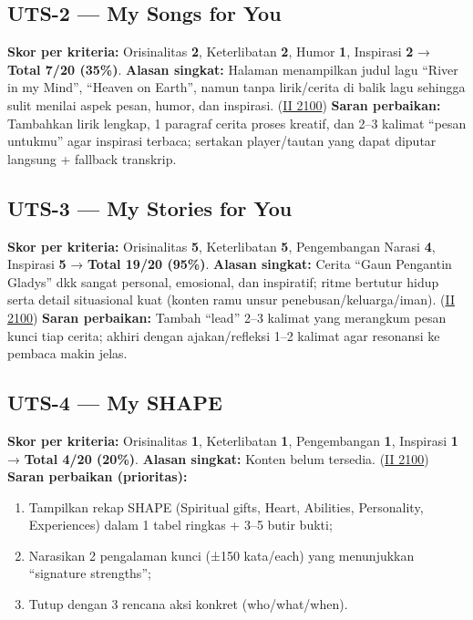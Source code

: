 \documentclass[
  letterpaper,
  DIV=11,
  numbers=noendperiod]{scrreprt}
\providecommand{\tightlist}{%
  \setlength{\itemsep}{0pt}\setlength{\parskip}{0pt}}
\begin{document}
\subsection{UTS-2 --- My Songs for You}\label{uts-2-my-songs-for-you-1}

\textbf{Skor per kriteria:} Orisinalitas \textbf{2}, Keterlibatan
\textbf{2}, Humor \textbf{1}, Inspirasi \textbf{2} → \textbf{Total 7/20
(35\%)}. \textbf{Alasan singkat:} Halaman menampilkan judul lagu ``River
in my Mind'', ``Heaven on Earth'', namun tanpa lirik/cerita di balik
lagu sehingga sulit menilai aspek pesan, humor, dan inspirasi.
(\href{https://ii-2100.github.io/all-about-me/My_Song_for_You/index.html}{II
2100}) \textbf{Saran perbaikan:} Tambahkan lirik lengkap, 1 paragraf
cerita proses kreatif, dan 2--3 kalimat ``pesan untukmu'' agar inspirasi
terbaca; sertakan player/tautan yang dapat diputar langsung + fallback
transkrip.

\subsection{UTS-3 --- My Stories for
You}\label{uts-3-my-stories-for-you-1}

\textbf{Skor per kriteria:} Orisinalitas \textbf{5}, Keterlibatan
\textbf{5}, Pengembangan Narasi \textbf{4}, Inspirasi \textbf{5} →
\textbf{Total 19/20 (95\%)}. \textbf{Alasan singkat:} Cerita ``Gaun
Pengantin Gladys'' dkk sangat personal, emosional, dan inspiratif; ritme
bertutur hidup serta detail situasional kuat (konten ramu unsur
penebusan/keluarga/iman).
(\href{https://ii-2100.github.io/all-about-me/My_Stories_for_You/index.html}{II
2100}) \textbf{Saran perbaikan:} Tambah ``lead'' 2--3 kalimat yang
merangkum pesan kunci tiap cerita; akhiri dengan ajakan/refleksi 1--2
kalimat agar resonansi ke pembaca makin jelas.

\subsection{UTS-4 --- My SHAPE}\label{uts-4-my-shape}

\textbf{Skor per kriteria:} Orisinalitas \textbf{1}, Keterlibatan
\textbf{1}, Pengembangan \textbf{1}, Inspirasi \textbf{1} →
\textbf{Total 4/20 (20\%)}. \textbf{Alasan singkat:} Konten belum
tersedia.
(\href{https://ii-2100.github.io/all-about-me/My_Shapes/index.html}{II
2100}) \textbf{Saran perbaikan (prioritas):}

\begin{enumerate}
\def\labelenumi{\arabic{enumi}.}
\tightlist
\item
  Tampilkan rekap SHAPE (Spiritual gifts, Heart, Abilities, Personality,
  Experiences) dalam 1 tabel ringkas + 3--5 butir bukti;
\item
  Narasikan 2 pengalaman kunci (±150 kata/each) yang menunjukkan
  ``signature strengths'';
\item
  Tutup dengan 3 rencana aksi konkret (who/what/when).
\end{enumerate}
\end{document}
